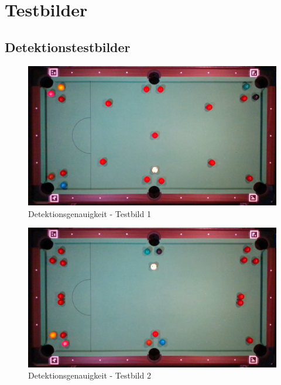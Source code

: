 \section{Testbilder}\label{anhang:testbilder}

\subsection{Detektionstestbilder}\label{anhang:detektionsgenauigkeit:testbilder}
\begin{figure}[h!]
    \begin{center}
        \includegraphics[width=0.8\linewidth]{../common/07_appendix/resources/00_detection/00_detektion_testbild_1.png}
    \end{center}
    \caption{Detektionsgenauigkeit - Testbild 1}
    \label{fig:detektionsgenauigkeit:testbild:1}
\end{figure}
\begin{figure}[h!]
    \begin{center}
        \includegraphics[width=0.8\linewidth]{../common/07_appendix/resources/00_detection/01_detektion_testbild_2.png}
    \end{center}
    \caption{Detektionsgenauigkeit - Testbild 2}
    \label{fig:detektionsgenauigkeit:testbild:2}
\end{figure}
